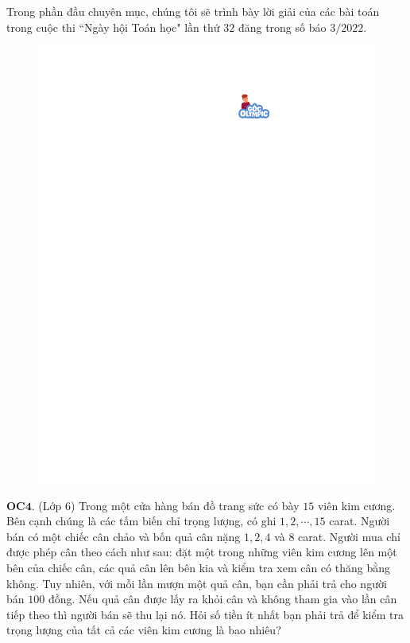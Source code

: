 \begin{multicols}{2}
	Trong phần đầu chuyên mục, chúng tôi sẽ trình bày lời giải của các bài toán trong cuộc thi ``Ngày hội Toán học" lần thứ $32$ đăng trong số báo $3/2022$. 
	\begin{figure}[H]
		\vspace*{-5pt}
		\centering
		\captionsetup{labelformat= empty, justification=centering}
		\includegraphics[width= 1\linewidth]{gocolympic}
		\vspace*{-15pt}
	\end{figure}
	{\bf\color{cackithi} OC$\pmb{4.}$} (Lớp $6$) Trong một cửa hàng bán đồ trang sức có bày $15$ viên kim cương. Bên cạnh chúng là các tấm biến chỉ trọng lượng, có ghi $1,2, \cdots,15$ carat. Người bán có một chiếc cân chảo và bốn quả cân nặng $1,2,4$ và $8$ carat. Người mua chỉ được phép cân theo cách như sau: đặt một trong những viên kim cương lên một bên của chiếc cân, các quả cân lên bên kia và kiểm tra xem cân có thăng bằng không. Tuy nhiên, với mỗi lần mượn một quả cân, bạn cần phải trả cho người bán $100$ đồng. Nếu quả cân được lấy ra khỏi cân và không tham gia vào lần cân tiếp theo thì người bán sẽ thu lại nó. Hỏi số tiền ít nhất bạn phải trả để kiểm tra trọng lượng của tất cả các viên kim cương là bao nhiêu?

\end{multicols}
